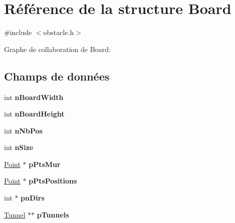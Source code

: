 \hypertarget{struct_board}{\section{Référence de la structure Board}
\label{struct_board}
}


{\ttfamily \#include $<$obstacle.\-h$>$}



Graphe de collaboration de Board\-:
\subsection*{Champs de données}
\begin{DoxyCompactItemize}
\item 
\hypertarget{struct_board_aad80ef820a78438beab291c8afd11537}{int {\bfseries n\-Board\-Width}}\label{struct_board_aad80ef820a78438beab291c8afd11537}

\item 
\hypertarget{struct_board_a7db097fc54460ad93ba4e27f87c6e415}{int {\bfseries n\-Board\-Height}}\label{struct_board_a7db097fc54460ad93ba4e27f87c6e415}

\item 
\hypertarget{struct_board_a5144d35dd645892013c497cebb2e9b1f}{int {\bfseries n\-Nb\-Pos}}\label{struct_board_a5144d35dd645892013c497cebb2e9b1f}

\item 
\hypertarget{struct_board_a69eba13a7543e1379e705b54823531a9}{int {\bfseries n\-Size}}\label{struct_board_a69eba13a7543e1379e705b54823531a9}

\item 
\hypertarget{struct_board_a15b7375925a07516d82c52733ec16874}{\hyperlink{struct_point}{Point} $\ast$ {\bfseries p\-Pts\-Mur}}\label{struct_board_a15b7375925a07516d82c52733ec16874}

\item 
\hypertarget{struct_board_ab251fa666350a133b8b089a26c93a623}{\hyperlink{struct_point}{Point} $\ast$ {\bfseries p\-Pts\-Positions}}\label{struct_board_ab251fa666350a133b8b089a26c93a623}

\item 
\hypertarget{struct_board_a1548ed096f3589f9a471cfad9795f6cd}{int $\ast$ {\bfseries pn\-Dirs}}\label{struct_board_a1548ed096f3589f9a471cfad9795f6cd}

\item 
\hypertarget{struct_board_ad6d98f6eaea3e9407a8a00127a6d5580}{\hyperlink{struct_tunnel}{Tunnel} $\ast$$\ast$ {\bfseries p\-Tunnels}}\label{struct_board_ad6d98f6eaea3e9407a8a00127a6d5580}


\end{DoxyCompactItemize}
